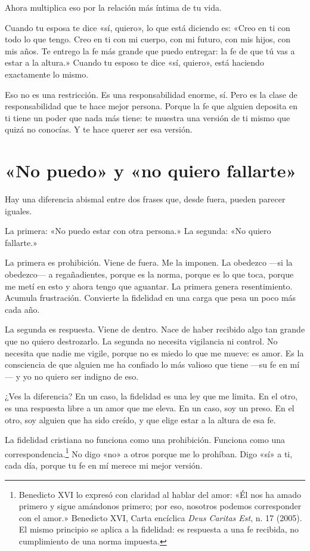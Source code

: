 Ahora multiplica eso por la relación más íntima de tu vida.

Cuando tu esposa te dice «sí, quiero», lo que está diciendo es: «Creo en ti con todo lo que tengo. Creo en ti con mi cuerpo, con mi futuro, con mis hijos, con mis años. Te entrego la fe más grande que puedo entregar: la fe de que tú vas a estar a la altura.» Cuando tu esposo te dice «sí, quiero», está haciendo exactamente lo mismo.

Eso no es una restricción. Es una responsabilidad enorme, sí. Pero es la clase de responsabilidad que te hace mejor persona. Porque la fe que alguien deposita en ti tiene un poder que nada más tiene: te muestra una versión de ti mismo que quizá no conocías. Y te hace querer ser esa versión.

\section{«No puedo» y «no quiero fallarte»}

Hay una diferencia abismal entre dos frases que, desde fuera, pueden parecer iguales.

La primera: «No puedo estar con otra persona.» La segunda: «No quiero fallarte.»

La primera es prohibición. Viene de fuera. Me la imponen. La obedezco ---si la obedezco--- a regañadientes, porque es la norma, porque es lo que toca, porque me metí en esto y ahora tengo que aguantar. La primera genera resentimiento. Acumula frustración. Convierte la fidelidad en una carga que pesa un poco más cada año.

La segunda es respuesta. Viene de dentro. Nace de haber recibido algo tan grande que no quiero destrozarlo. La segunda no necesita vigilancia ni control. No necesita que nadie me vigile, porque no es miedo lo que me mueve: es amor. Es la consciencia de que alguien me ha confiado lo más valioso que tiene ---su fe en mí--- y yo no quiero ser indigno de eso.

¿Ves la diferencia? En un caso, la fidelidad es una ley que me limita. En el otro, es una respuesta libre a un amor que me eleva. En un caso, soy un preso. En el otro, soy alguien que ha sido creído, y que elige estar a la altura de esa fe.

La fidelidad cristiana no funciona como una prohibición. Funciona como una correspondencia.\footnote{Benedicto XVI lo expresó con claridad al hablar del amor: «Él nos ha amado primero y sigue amándonos primero; por eso, nosotros podemos corresponder con el amor.» Benedicto XVI, Carta encíclica \textit{Deus Caritas Est}, n. 17 (2005). El mismo principio se aplica a la fidelidad: es respuesta a una fe recibida, no cumplimiento de una norma impuesta.} No digo «no» a otros porque me lo prohíban. Digo «sí» a ti, cada día, porque tu fe en mí merece mi mejor versión.

